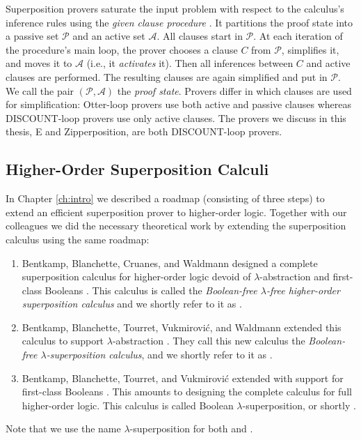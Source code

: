 Superposition provers saturate the input problem with respect to the calculus's
inference rules using the \emph{given clause procedure}
\cite{mcw-1997-otter,adf-1995-discount}. It partitions the proof state into a
passive set $\mathcal{P}$ and an active set $\mathcal{A}$. All clauses start in
$\mathcal{P}$. At each iteration of the procedure's main loop, the prover
chooses a clause $C$ from $\mathcal{P}$, simplifies it, and moves it to
$\mathcal{A}$ (i.e., it \emph{activates} it). Then all inferences between $C$ and active clauses are performed.
The resulting clauses are again simplified and put in $\mathcal{P}$.
We call the pair $(\mathcal{P}, \mathcal{A})$ the \emph{proof state}.
Provers differ in which clauses are used for simplification: Otter-loop
\cite{mcw-1997-otter} provers use both active and passive clauses whereas
DISCOUNT-loop \cite{adf-1995-discount} provers use only active clauses.
The provers we discuss in this thesis, E and Zipperposition, are both DISCOUNT-loop provers.

\subsection{Higher-Order Superposition Calculi}
\label{sec:pre:ho-sup-calculi}

In Chapter \ref{ch:intro} we described a roadmap (consisting of three steps) to
extend an efficient superposition prover to higher-order logic. Together with
our colleagues we did the necessary theoretical work by extending the
superposition calculus using the same roadmap:

\begin{enumerate}
    \item Bentkamp, Blanchette, Cruanes, and Waldmann designed a complete
    superposition calculus for higher-order logic devoid of
    $\lambda$-abstraction and first-class Booleans \cite{bbcw-21-lfho}. This calculus is called the \emph{Boolean-free $\lambda$-free higher-order superposition calculus} 
    and we shortly refer to it as \lfsup{}.
    \item \begin{sloppypar}
    Bentkamp, Blanchette, Tourret,  Vukmirović, and Waldmann
    extended this calculus to support $\lambda$-abstraction
    \cite{bbtvw-21-sup-lam}. They call this new calculus the \emph{Boolean-free $\lambda$-superposition calculus},
    and we shortly refer to it as \lsup{}.
    \end{sloppypar}        
    \item Bentkamp, Blanchette, Tourret, and Vukmirovi\'c extended \lsup{} with
    support for first-class Booleans \cite{bbtv-21-full-ho-sup}. This amounts to
    designing the complete calculus for full higher-order logic. This
    calculus is called Boolean $\lambda$-superposition, or shortly \osup{}.
\end{enumerate}
%
Note that we use the name $\lambda$-superposition for both \lsup{}
and \osup{}.

